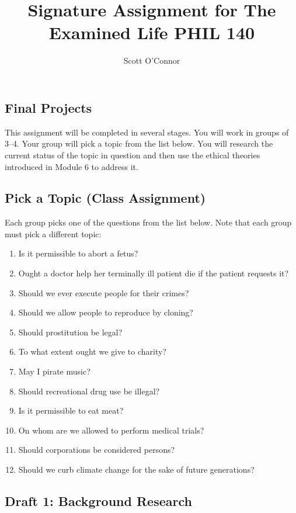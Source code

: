 \documentclass[10pt]{article}
\title{Signature Assignment for The Examined Life PHIL 140 }
\author{Scott O’Connor}
\providecommand{\tightlist}{%
  \setlength{\itemsep}{0pt}\setlength{\parskip}{0pt}}
\begin{document}
\maketitle

\subsection{Final Projects}\label{final-projects}

This assignment will be completed in several stages. You will work in groups of 3--4.
Your group will pick a topic from the list below. You will research the
current status of the topic in question and then use the ethical
theories introduced in Module 6 to address it.

\subsection{Pick a Topic (Class
Assignment)}\label{pick-a-topic-class-assignment}

Each group picks one of the questions from the list below. Note that
each group must pick a different topic:

\begin{enumerate}
\def\labelenumi{\arabic{enumi}.}
\tightlist
\item
  Is it permissible to abort a fetus?
\item
  Ought a doctor help her terminally ill patient die if the patient
  requests it?
\item
  Should we ever execute people for their crimes?
\item
  Should we allow people to reproduce by cloning?
\item
  Should prostitution be legal?
\item
  To what extent ought we give to charity?
\item
  May I pirate music?
\item
  Should recreational drug use be illegal?
\item
  Is it permissible to eat meat?
\item
  On whom are we allowed to perform medical trials?
\item
  Should corporations be considered persons?
\item
  Should we curb climate change for the sake of future generations?
\end{enumerate}

\subsection{Draft 1: Background
Research}\label{draft-1-background-research}
\end{document}
